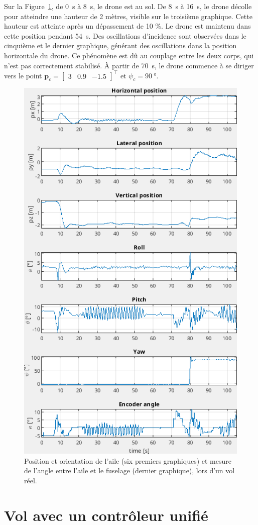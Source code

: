 Sur la Figure~\ref{fig:colibri_flight}, de \SI{0}{\second} à \SI{8}{\second}, le drone est au sol. De \SI{8}{\second} à \SI{16}{\second}, le drone décolle pour atteindre une hauteur de 2 mètres, visible sur le troisième graphique. Cette hauteur est atteinte après un dépassement de 10 \%. Le drone est maintenu dans cette position pendant \SI{54}{\second}. Des oscillations d'incidence sont observées dans le cinquième et le dernier graphique, générant des oscillations dans la position horizontale du drone. Ce phénomène est dû au couplage entre les deux corps, qui n'est pas correctement stabilisé. À partir de \SI{70}{\second}, le drone commence à se diriger vers le point $\boldsymbol{p}_{c} = \begin{bmatrix} 3 & 0.9 & -1.5 \end{bmatrix}^\top$ et $\psi_{c}=\SI{90}{\degree}$.
\begin{figure}[ht!]
\centering
    \includegraphics[width=0.6\columnwidth,angle=0]{figures/colibri_flight.png}
    \caption{Position et orientation de l'aile (six premiers graphiques) et mesure de l'angle entre l'aile et le fuselage (dernier graphique), lors d'un vol réel. }
    \label{fig:colibri_flight}
\end{figure}

\section{Vol avec un contrôleur unifié}

